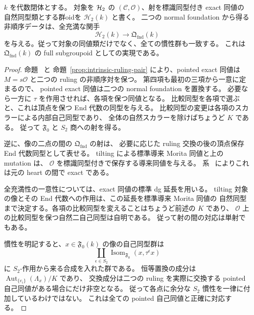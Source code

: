 \begin{corollary}[$\HH$ の幾何点群oidの全充満な実現]
\label{cor:h2-point-groupoid-foundation}
$k$ を代数閉体とする。
対象を $\HH$ の $(\mathcal C,\mathcal O)$、射を標識同型付き exact 同値の
自然同型類とする群oidを $\mathcal H_2(k)$ と書く。
二つの normal foundation から得る非順序データは、全充満な関手
\[
 \mathcal H_2(k)\longrightarrow\mathfrak Q_{\mathrm{fnd}}(k)
\]
を与える。従って対象の同値類だけでなく、全ての慣性群も一致する。
これは $\mathfrak Q_{\mathrm{fnd}}(k)$ の full subgroupoid としての実現である。
\end{corollary}

\begin{proof}
命題~\cite[\texttt{prop:first-orbit-object}]{QuadricIntrinsic2026} と
命題~\ref{prop:intrinsic-ruling-pair} により、pointed exact 同値は
$M=s\mathcal O$ と二つの ruling の非順序対を保つ。
第四項も最初の三項から一意に定まるので、
pointed exact 同値は二つの normal foundation を置換する。
必要なら一方に $\tau$ を作用させれば、各項を保つ同値となる。
比較同型を各項で選ぶと、これは頂点を保つ End 代数の同型を与える。
比較同型の変更は各項のスカラーによる内部自己同型であり、
全体の自然スカラーを除けばちょうど $K$ である。
従って $\mathfrak F_0$ と $S_2$ 商への射を得る。

逆に、像の二点の間の $\mathfrak Q_{\mathrm{fnd}}$ の射は、
必要に応じた ruling 交換の後の頂点保存 End 代数同型として表せる。
tilting による標準導来 Morita 同値と上の mutation は、
$\mathcal O$ を標識同型付きで保存する導来同値を与える。
系~\cite[\texttt{cor:pointed-derived-exact}]{QuadricIntrinsic2026} によりこれは元の heart の間で exact である。

全充満性の一意性については、exact 同値の標準 dg 延長を用いる。
tilting 対象の像とその End 代数への作用は、この延長を標準導来 Morita 同値の
自然同型まで決定する。各項の比較同型を変えることはちょうど前述の $K$ であり、
$\mathcal O$ 上の比較同型を保つ自然二自己同型は自明である。
従って射の間の対応は単射でもある。

慣性を明記すると、$x\in\mathfrak F_0(k)$ の像の自己同型群は
\[
 \coprod_{\epsilon\in S_2}
       \operatorname{Isom}_{\mathfrak F_0}(x,\tau^\epsilon x)
\]
に $S_2$-作用から来る合成を入れた群である。
恒等置換の成分は
$\operatorname{Aut}_{\{e_i\}}(\Lambda_x)/K$ であり、
交換成分は二つの ruling を実際に交換する pointed 自己同値がある場合にだけ非空となる。
従って各点に余分な $S_2$ 慣性を一律に付加しているわけではない。
これは全ての pointed 自己同値と正確に対応する。
\end{proof}

